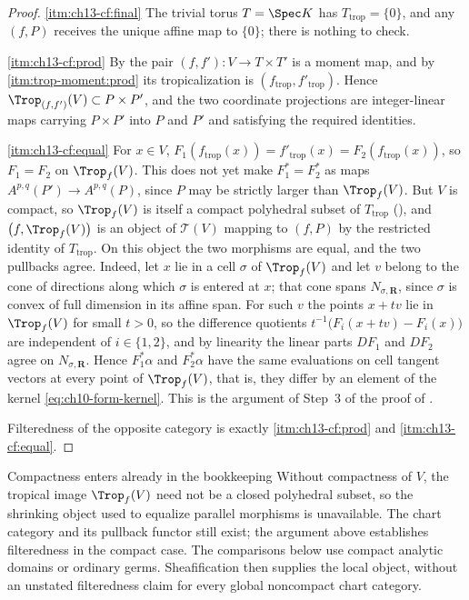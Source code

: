 \begin{proof}
\cref{itm:ch13-cf:final} The trivial torus $T=\Spec K$ has
$T_{\mathrm{trop}}=\{0\}$, and any $(f,P)$ receives the unique affine map
to $\{0\}$; there is nothing to check.

\cref{itm:ch13-cf:prod} By  the pair
$(f,f'):V\to T\times T'$ is a moment map, and by
\,\cref{itm:trop-moment:prod} its tropicalization
is $(f_{\mathrm{trop}},f'_{\mathrm{trop}})$.  Hence
$\Trop_{(f,f')}(V)\subset P\times P'$, and the two coordinate projections
are integer-linear maps carrying $P\times P'$ into $P$ and $P'$ and
satisfying the required identities.

\cref{itm:ch13-cf:equal} For $x\in V$,
$F_1(f_{\mathrm{trop}}(x))=f'_{\mathrm{trop}}(x)=F_2(f_{\mathrm{trop}}(x))$,
so $F_1=F_2$ on $\Trop_f(V)$.  This does not yet make $F_1^*=F_2^*$ as maps
$A^{p,q}(P')\to A^{p,q}(P)$, since $P$ may be strictly larger than
$\Trop_f(V)$.  But $V$ is compact, so $\Trop_f(V)$ is itself a compact
polyhedral subset of $T_{\mathrm{trop}}$
(), and
$\bigl(f,\Trop_f(V)\bigr)$ is an object of $\mathscr T(V)$ mapping to
$(f,P)$ by the restricted identity of $T_{\mathrm{trop}}$.  On this
object the two morphisms are equal, and the two pullbacks agree.  Indeed,
let $x$ lie in a cell $\sigma$ of
$\Trop_f(V)$ and let $v$ belong to the cone of directions along which
$\sigma$ is entered at $x$; that cone spans $N_{\sigma,\mathbf R}$, since
$\sigma$ is convex of full dimension in its affine span.  For such $v$ the
points $x+tv$ lie in $\Trop_f(V)$ for small $t>0$, so the difference
quotients $t^{-1}\bigl(F_i(x+tv)-F_i(x)\bigr)$ are independent of
$i\in\{1,2\}$, and by linearity the linear parts $DF_1$ and $DF_2$ agree on
$N_{\sigma,\mathbf R}$.  Hence $F_1^*\alpha$ and $F_2^*\alpha$ have the same
evaluations on cell tangent vectors at every point of $\Trop_f(V)$, that is,
they differ by an element of the kernel \eqref{eq:ch10-form-kernel}.  This is
the argument of Step~3 of the proof of
.

Filteredness of the opposite category is exactly
\cref{itm:ch13-cf:prod} and \cref{itm:ch13-cf:equal}.
\end{proof}

\begin{warning}{Compactness enters already in the bookkeeping}
Without compactness of $V$, the tropical image $\Trop_f(V)$ need not be a
closed polyhedral subset, so the shrinking object used to equalize parallel
morphisms is unavailable.  The chart category and its pullback functor still
exist; the argument above establishes filteredness in the compact case.
The comparisons below use compact analytic domains or ordinary germs.
Sheafification then supplies the local object, without an unstated
filteredness claim for every global noncompact chart category.
\end{warning}

